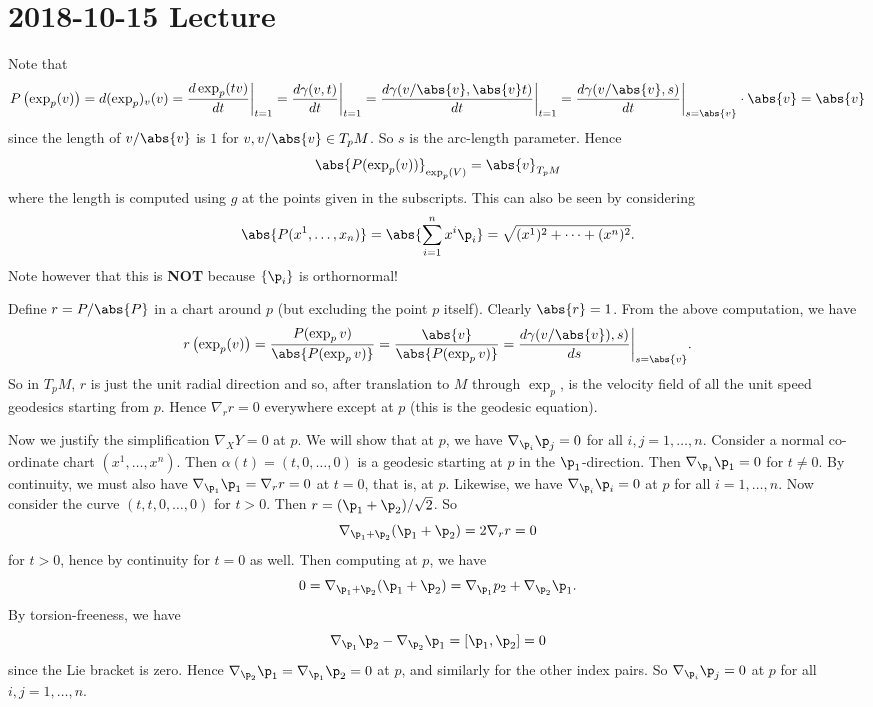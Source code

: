 \section{2018-10-15 Lecture}

Note that
\[ P\left( \exp_p(v) \right) = d(\exp_p)_v(v) = \frac{d\exp_p(tv)}{dt}\bigg\vert_{t=1} = \frac{d\gamma(v,t)}{dt}\bigg\vert_{t=1} = \frac{d\gamma(v/\abs{v},\abs{v}t)}{dt}\bigg\vert_{t=1} = \frac{d\gamma(v/\abs{v},s)}{dt}\bigg\vert_{s=\abs{v}}\cdot\abs{v} = \abs{v} \]
since the length of $v/\abs{v}$ is $1$ for $v,v/\abs{v}\in T_pM$.
So $s$ is the arc-length parameter.
Hence
\[ \abs{P(\exp_p(v))}_{\exp_p(V)} = \abs{v}_{T_pM} \]
where the length is computed using $g$ at the points given in the subscripts.
This can also be seen by considering
\[ \abs{P(x^1,\ldots,x_n)}=\abs{\sum_{i=1}^nx^i\p_i}=\sqrt{(x^1)^2+\cdots+(x^n)^2}. \]
Note however that this is \textbf{NOT} because $\{\p_i\}$ is orthornormal!

Define $r=P/\abs{P}$ in a chart around $p$ (but excluding the point $p$ itself).
Clearly $\abs{r}=1$.
From the above computation, we have
\[ r\left( \exp_p(v) \right) = \frac{P(\exp_pv)}{\abs{P(\exp_pv)}} = \frac{\abs{v}}{\abs{P(\exp_pv)}} = \frac{d\gamma(v/\abs{v}),s)}{ds}\bigg\vert_{s=\abs{v}}. \]
So in $T_pM$, $r$ is just the unit radial direction and so, after translation to $M$ through $\exp_p$, is the velocity field of all the unit speed geodesics starting from $p$.
Hence $\nabla_rr=0$ everywhere except at $p$ (this is the geodesic equation).

Now we justify the simplification $\nabla_XY=0$ at $p$.
We will show that at $p$, we have $\nabla_{\p_i}\p_j=0$ for all $i,j=1,\ldots,n$.
Consider a normal co-ordinate chart $(x^1,\ldots,x^n)$.
Then $\alpha(t)=(t,0,\ldots,0)$ is a geodesic starting at $p$ in the $\p_1$-direction.
Then $\nabla_{\p_1}\p_1=0$ for $t\neq0$.
By continuity, we must also have $\nabla_{\p_1}\p_1=\nabla_rr=0$ at $t=0$, that is, at $p$.
Likewise, we have $\nabla_{\p_i}\p_i=0$ at $p$ for all $i=1,\ldots,n$.
Now consider the curve $(t,t,0,\ldots,0)$ for $t>0$.
Then $r=(\p_1+\p_2)/\sqrt{2}$.
So
\[ \nabla_{\p_1+\p_2}(\p_1+\p_2)=2\nabla_rr=0 \]
for $t>0$, hence by continuity for $t=0$ as well.
Then computing at $p$, we have
\[ 0 = \nabla_{\p_1+\p_2}(\p_1+\p_2) = \nabla_{\p_1}p_2 + \nabla_{\p_2}\p_1. \]
By torsion-freeness, we have
\[ \nabla_{\p_1}\p_2-\nabla_{\p_2}\p_1=[\p_1,\p_2]=0 \]
since the Lie bracket is zero.
Hence $\nabla_{\p_2}\p_1=\nabla_{\p_1}\p_2=0$ at $p$, and similarly for the other index pairs.
So $\nabla_{\p_i}\p_j=0$ at $p$ for all $i,j=1,\ldots,n$.

